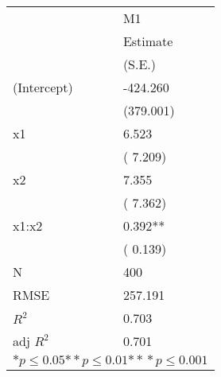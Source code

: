 \begin{tabular}{*{2}{l}}
\hline
                  & M1   \tabularnewline
                   &Estimate \tabularnewline
                 &(S.E.) \tabularnewline
 \hline
 \hline
   (Intercept)     &-424.260 \tabularnewline
                 &(379.001)  \tabularnewline
   x1              &6.523 \tabularnewline
                 &(  7.209)  \tabularnewline
   x2              &7.355 \tabularnewline
                 &(  7.362)  \tabularnewline
   x1:x2           &0.392** \tabularnewline
                 &(  0.139)  \tabularnewline
 \hline
 N                 &400       \tabularnewline
 RMSE             &257.191   \tabularnewline
 $R^2$             &0.703   \tabularnewline
 adj $R^2$         &0.701   \tabularnewline
 \hline
\hline
 
 \multicolumn{2}{c}{${*  p}\le 0.05$${*\!\!*  p}\le 0.01$${*\!\!*\!\!*  p}\le 0.001$}\tabularnewline
 \end{tabular}